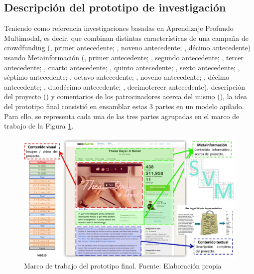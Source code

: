 \subsection{Descripción del prototipo de investigación}
Teniendo como referencia investigaciones basadas en Aprendizaje Profundo Multimodal, es decir, que combinan distintas características de una campaña de crowdfunding (\citeauthor{pr_kamath2018suplearn}, primer antecedente; \citeauthor{pr_jin2019dayssuccess}, noveno antecedente; \citeauthor{pr_cheng2019deeplearning}, décimo antecedente) usando Metainformación (\citeauthor{pr_kamath2018suplearn}, primer antecedente; \citeauthor{pr_beckwith2016predcrowd}, segundo antecedente; \citeauthor{pr_zhou2018projectdesc}, tercer antecedente; \citeauthor{pr_yuan2016textanalytics}, cuarto antecedente; \citeauthor{pr_chen2015predcrowd}, quinto antecedente; \citeauthor{pr_li2016predcrowd}, sexto antecedente; \citeauthor{pr_kaur2017socmedcrowd}, séptimo antecedente; \citeauthor{pr_yu2018deeplearning}, octavo antecedente; \citeauthor{pr_jin2019dayssuccess}, noveno antecedente; \citeauthor{pr_cheng2019deeplearning}, décimo antecedente; \citeauthor{pr_mitra2014phrases}, duodécimo antecedente; \citeauthor{pr_sawhney2016usingLT}, decimotercer antecedente), descripción del proyecto () y comentarios de los patrocinadores acerca del mismo (), la idea del prototipo final consistió en ensamblar estas 3 partes en un modelo apilado. Para ello, se representa cada una de las tres partes agrupadas en el marco de trabajo de la Figura \ref{3:fig1}.
\begin{figure}[htbp]
	\begin{center}
		\includegraphics[width=1\textwidth]{3/figures/prototipo.jpg}
		\caption{Marco de trabajo del prototipo final. Fuente: Elaboración propia}
		\label{3:fig1}
	\end{center}
\end{figure}


